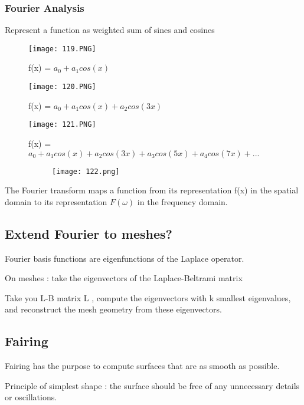 \documentclass{article}
\begin{document}
\subsubsection{Fourier Analysis}

Represent a function as weighted sum of sines and cosines

\begin{figure}[!htb]
  \texttt{[image: 119.PNG]}
  \caption{f(x) = $a_0 + a_1cos(x)$}
  
\endminipage\hfill
{}
  \texttt{[image: 120.PNG]}
\caption{f(x) = $a_0 + a_1cos(x) + a_2cos(3x)$}  
  
\endminipage\hfill
{}%
  \texttt{[image: 121.PNG]}
 \caption{f(x) = $a_0 + a_1cos(x) + a_2cos(3x) + a_3cos(5x) + a_4cos(7x) + ...$}  
  
\endminipage
\end{figure}


    \begin{figure}[ht!]
  \centering
  \begin{subfigure}[b]{0.7\linewidth}
    \texttt{[image: 122.png]}
  \end{subfigure}
\end{figure}

The Fourier transform maps a function from its representation f(x) in the spatial domain to its representation $F(\omega)$ in the frequency domain.

\subsection{Extend Fourier to meshes?}

Fourier basis functions are eigenfunctions of the Laplace operator.

On meshes : take the eigenvectors of the Laplace-Beltrami matrix

Take you L-B matrix L , compute the eigenvectors with k smallest eigenvalues, and reconstruct the mesh geometry from these eigenvectors.

\subsection{Fairing}

Fairing has the purpose to compute surfaces that are as smooth as possible.

Principle of simplest shape : the surface should be free of any unnecessary details or oscillations.
\end{document}
